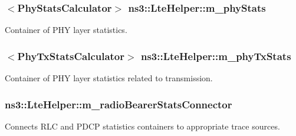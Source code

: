 \subsubsection[{\texorpdfstring{m\+\_\+phy\+Stats}{m_phyStats}}]{$<${\bf Phy\+Stats\+Calculator}$>$ ns3\+::\+Lte\+Helper\+::m\+\_\+phy\+Stats\hspace{0.3cm}{\ttfamily [private]}}\hypertarget{classns3_1_1LteHelper_aa58d6da60336a1a62434e737007f66d4}{}\label{classns3_1_1LteHelper_aa58d6da60336a1a62434e737007f66d4}


Container of P\+HY layer statistics. 

\subsubsection[{\texorpdfstring{m\+\_\+phy\+Tx\+Stats}{m_phyTxStats}}]{$<${\bf Phy\+Tx\+Stats\+Calculator}$>$ ns3\+::\+Lte\+Helper\+::m\+\_\+phy\+Tx\+Stats\hspace{0.3cm}{\ttfamily [private]}}\hypertarget{classns3_1_1LteHelper_a6bd4ce0109b43d51150164038eba7a01}{}\label{classns3_1_1LteHelper_a6bd4ce0109b43d51150164038eba7a01}


Container of P\+HY layer statistics related to transmission. 

\subsubsection[{\texorpdfstring{m\+\_\+radio\+Bearer\+Stats\+Connector}{m_radioBearerStatsConnector}}]{ ns3\+::\+Lte\+Helper\+::m\+\_\+radio\+Bearer\+Stats\+Connector\hspace{0.3cm}{\ttfamily [private]}}\hypertarget{classns3_1_1LteHelper_a9150dda8d0a04d3fd72b48cd906ad864}{}\label{classns3_1_1LteHelper_a9150dda8d0a04d3fd72b48cd906ad864}


Connects R\+LC and P\+D\+CP statistics containers to appropriate trace sources. 

